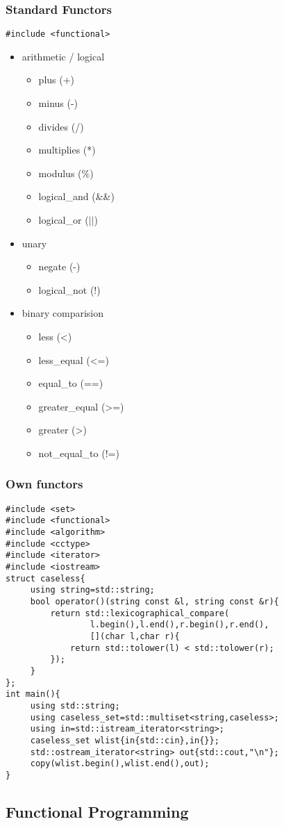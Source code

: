 \subsubsection{Standard Functors}
\begin{lstlisting}
#include <functional>
\end{lstlisting}
\begin{itemize}
\item arithmetic / logical
	\begin{itemize}
	\item plus (+)
	\item minus (-)
	\item divides (/)
	\item multiplies (*)
	\item modulus (\%)
	\item logical\_and (\&\&)
	\item logical\_or ($||$)
	\end{itemize}
	
	\item unary
	\begin{itemize}
	\item negate (-)
	\item logical\_not (!)
	\end{itemize}
	
	\item binary comparision
	\begin{itemize}
	\item less (<)
	\item less\_equal (<=)
	\item equal\_to (==)
	\item greater\_equal (>=)
	\item greater (>)
	\item not\_equal\_to (!=)
	\end{itemize}
\end{itemize}

\subsubsection{Own functors}
\begin{lstlisting}
#include <set>
#include <functional>
#include <algorithm>
#include <cctype>
#include <iterator>
#include <iostream>
struct caseless{
	 using string=std::string;
	 bool operator()(string const &l, string const &r){
	 	 return std::lexicographical_compare(
	 	 	 	 l.begin(),l.end(),r.begin(),r.end(),
	 	 	 	 [](char l,char r){
	 	 	 return std::tolower(l) < std::tolower(r);
	 	 });
	 }
};
int main(){
	 using std::string;
	 using caseless_set=std::multiset<string,caseless>;
	 using in=std::istream_iterator<string>;
	 caseless_set wlist{in{std::cin},in{}};
	 std::ostream_iterator<string> out{std::cout,"\n"};
	 copy(wlist.begin(),wlist.end(),out);
}
\end{lstlisting}

\subsection{Functional Programming}


